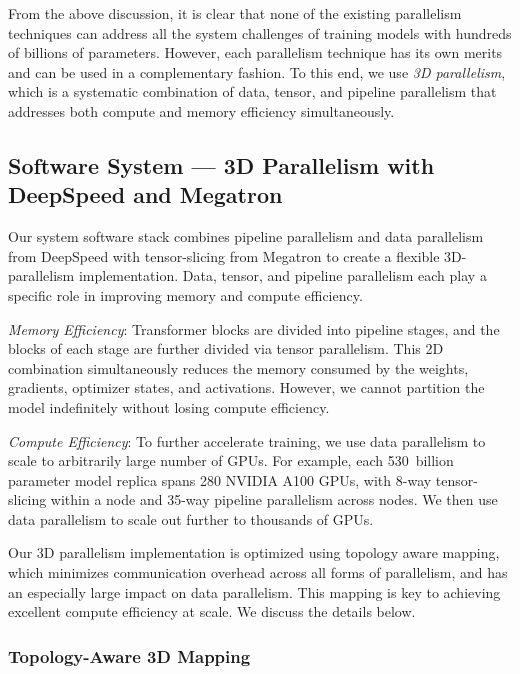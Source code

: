 \documentclass[11pt]{article}
\begin{document}
From the above discussion, it is clear that none of the existing parallelism
techniques can address all the system challenges of training models with
hundreds of billions of parameters. However, each
parallelism technique has its own merits and can be used in a complementary
fashion.
To this end, we use \emph{3D parallelism}, which is a systematic combination of data, tensor, and pipeline
parallelism that addresses both compute and memory efficiency
simultaneously. 


\subsection{Software System --- 3D Parallelism with DeepSpeed and Megatron }

Our system software stack combines pipeline parallelism and data parallelism
from DeepSpeed with tensor-slicing from Megatron to create a flexible
3D-parallelism implementation. %
Data, tensor, and pipeline
parallelism each play a specific role in improving memory and compute
efficiency.

\textit{Memory Efficiency}: Transformer blocks are divided into pipeline
stages, and the blocks of each stage are further divided via tensor parallelism.
This 2D combination simultaneously reduces the memory consumed by the weights,
gradients, optimizer states, and activations. However, we cannot partition the model indefinitely without losing compute efficiency.

\textit{Compute Efficiency}: To further accelerate training,
we use data parallelism to scale to arbitrarily large number of GPUs.
For example, each 530~billion parameter model replica spans 280 NVIDIA A100 GPUs, with 8-way
tensor-slicing within a node and 35-way pipeline parallelism across nodes.
We then use data parallelism to scale out further to thousands of GPUs.

Our 3D parallelism implementation is optimized using topology aware mapping,
which minimizes communication overhead across all forms of parallelism, and has an  especially large impact on data parallelism. This mapping is key to achieving excellent
compute efficiency at scale. We discuss the details below.

\subsubsection{Topology-Aware 3D Mapping} 
\end{document}
